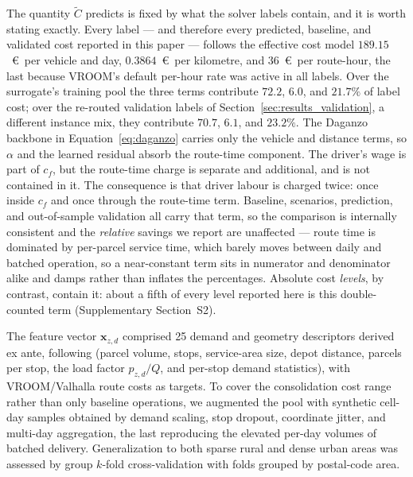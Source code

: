 \documentclass[preprint,12pt,authoryear]{elsarticle}
\begin{document}
The quantity $\tilde{C}$ predicts is fixed by what the solver labels contain, and it is worth stating exactly. Every label --- and therefore every predicted, baseline, and validated cost reported in this paper --- follows the effective cost model $189.15$~\euro\ per vehicle and day, $0.3864$~\euro\ per kilometre, and $36$~\euro\ per route-hour, the last because VROOM's default per-hour rate was active in all labels. Over the surrogate's training pool the three terms contribute $72.2$, $6.0$, and $21.7\%$ of label cost; over the re-routed validation labels of Section~\ref{sec:results_validation}, a different instance mix, they contribute $70.7$, $6.1$, and $23.2\%$. The Daganzo backbone in Equation~\eqref{eq:daganzo} carries only the vehicle and distance terms, so $\alpha$ and the learned residual absorb the route-time component. The driver's wage is part of $c_f$, but the route-time charge is separate and additional, and is not contained in it. The consequence is that driver labour is charged twice: once inside $c_f$ and once through the route-time term. Baseline, scenarios, prediction, and out-of-sample validation all carry that term, so the comparison is internally consistent and the \emph{relative} savings we report are unaffected --- route time is dominated by per-parcel service time, which barely moves between daily and batched operation, so a near-constant term sits in numerator and denominator alike and damps rather than inflates the percentages. Absolute cost \emph{levels}, by contrast, contain it: about a fifth of every level reported here is this double-counted term (Supplementary Section~S2).

The feature vector $\mathbf{x}_{z,d}$ comprised 25 demand and geometry descriptors derived ex ante, following \citet{Akkerman2025} (parcel volume, stops, service-area size, depot distance, parcels per stop, the load factor $p_{z,d}/Q$, and per-stop demand statistics), with VROOM/Valhalla route costs as targets. To cover the consolidation cost range rather than only baseline operations, we augmented the pool with synthetic cell-day samples obtained by demand scaling, stop dropout, coordinate jitter, and multi-day aggregation, the last reproducing the elevated per-day volumes of batched delivery. Generalization to both sparse rural and dense urban areas was assessed by group $k$-fold cross-validation with folds grouped by postal-code area.
\end{document}

